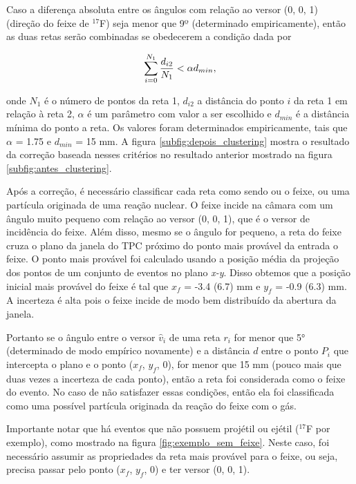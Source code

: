 \documentclass[a4paper,12pt,oneside]{book}
\begin{document}
\par Caso a diferença absoluta entre os ângulos com relação ao versor (0, 0, 1) (direção do feixe de $^{17}$F) seja menor que 9º (determinado empiricamente), então as duas retas serão combinadas se obedecerem a condição dada por

\begin{equation}\label{criterio_clustering}
    \sum_{i = 0}^{N_1}\frac{d_{i2}}{N_1} < \alpha \space d_{min}, 
\end{equation}

onde $N_1$ é o número de pontos da reta 1, $d_{i2}$ a distância do ponto $i$ da reta 1 em relação à reta 2, $\alpha$ é um parâmetro com valor a ser escolhido e $d_{min}$ é a distância mínima do ponto a reta. Os valores foram determinados empiricamente, tais que $\alpha$ = 1.75 e $d_{min}$ = 15 mm. A figura \ref{subfig:depois_clustering} mostra o resultado da correção baseada nesses critérios no resultado anterior mostrado na figura \ref{subfig:antes_clustering}.

\par Após a correção, é necessário classificar cada reta como sendo ou o feixe, ou uma partícula originada de uma reação nuclear. O feixe incide na câmara com um ângulo muito pequeno com relação ao versor (0, 0, 1), que é o versor de incidência do feixe. Além disso, mesmo se o ângulo for pequeno, a reta do feixe cruza o plano da janela do TPC próximo do ponto mais provável da entrada o feixe. O ponto mais provável foi calculado usando a posição média da projeção dos pontos de um conjunto de eventos no plano \textit{x-y}. Disso obtemos que a posição inicial mais provável do feixe é tal que $x_f$ = -3.4 (6.7) mm e $y_f$ = -0.9 (6.3) mm. A incerteza é alta pois o feixe incide de modo bem distribuído da abertura da janela.

\par Portanto se o ângulo entre o versor $\hat{v}_i$ de uma reta $r_i$ for menor que 5° (determinado de modo empírico novamente) e a distância $d$ entre o ponto $P_i$ que intercepta o plano e o ponto ($x_f$, $y_f$, 0), for menor que 15 mm (pouco mais que duas vezes a incerteza de cada ponto), então a reta foi considerada como o feixe do evento. No caso de não satisfazer essas condições, então ela foi classificada como uma possível partícula originada da reação do feixe com o gás.

\par Importante notar que há eventos que não possuem projétil ou ejétil ($^{17}$F por exemplo), como mostrado na figura \ref{fig:exemplo_sem_feixe}. Neste caso, foi necessário assumir as propriedades da reta mais provável para o feixe, ou seja, precisa passar pelo ponto ($x_f$, $y_f$, 0) e ter versor (0, 0, 1).
\end{document}

